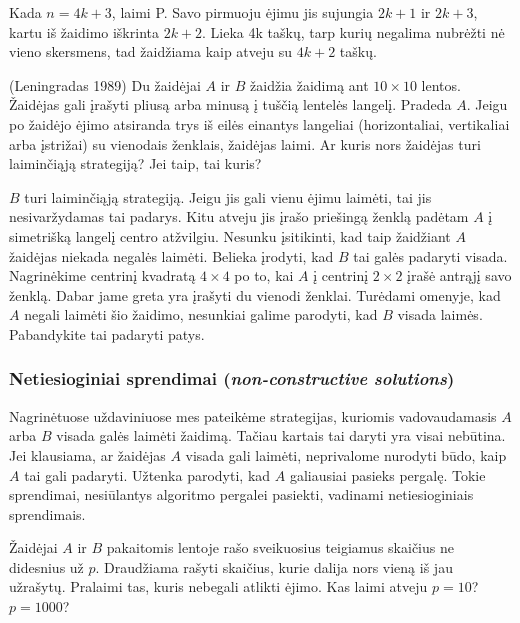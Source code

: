 Kada $n=4k+3$, laimi P. Savo pirmuoju ėjimu jis sujungia $2k+1$ ir $2k+3$,
kartu iš žaidimo iškrinta $2k+2$. Lieka 4k taškų, tarp kurių negalima
nubrėžti nė vieno skersmens, tad žaidžiama kaip atveju su $4k+2$ taškų. 

\begin{pavnr}{(Leningradas 1989)}
  Du žaidėjai $A$ ir $B$ žaidžia žaidimą ant $10\times 10$ lentos. Žaidėjas
  gali įrašyti pliusą arba minusą į tuščią lentelės langelį. Pradeda $A$.
  Jeigu po žaidėjo ėjimo atsiranda trys iš eilės einantys langeliai
  (horizontaliai, vertikaliai arba įstrižai) su vienodais ženklais,
  žaidėjas laimi. Ar kuris nors žaidėjas turi laiminčiąją strategiją? Jei
  taip, tai kuris?
\end{pavnr}

$B$ turi laiminčiąją strategiją. Jeigu jis gali vienu ėjimu laimėti, tai jis
nesivaržydamas  tai padarys. Kitu atveju jis įrašo priešingą ženklą padėtam
$A$ į simetrišką langelį centro atžvilgiu. Nesunku įsitikinti, kad taip
žaidžiant $A$ žaidėjas niekada negalės laimėti. Belieka
įrodyti, kad $B$ tai galės padaryti visada. Nagrinėkime centrinį kvadratą
$4\times 4$ po to, kai $A$ į centrinį $2\times 2$ įrašė antrąjį savo
ženklą. Dabar jame greta yra įrašyti du vienodi ženklai. Turėdami omenyje,
kad $A$ negali laimėti šio žaidimo, nesunkiai galime parodyti, kad $B$ visada
laimės. Pabandykite tai padaryti patys.  

\subsubsection{Netiesioginiai sprendimai (\emph{non-constructive solutions})}

Nagrinėtuose uždaviniuose mes pateikėme strategijas, kuriomis
vadovaudamasis $A$ arba $B$ visada galės laimėti žaidimą. Tačiau kartais tai
daryti yra visai nebūtina. Jei klausiama, ar žaidėjas $A$ visada gali
laimėti, neprivalome nurodyti būdo, kaip $A$ tai gali padaryti. Užtenka
parodyti, kad $A$ galiausiai pasieks pergalę. Tokie sprendimai, nesiūlantys
algoritmo pergalei pasiekti, vadinami netiesioginiais sprendimais. 

\begin{pavnr}
  Žaidėjai $A$ ir $B$ pakaitomis lentoje rašo sveikuosius teigiamus skaičius
  ne didesnius už $p$. Draudžiama rašyti skaičius, kurie dalija nors vieną iš
  jau užrašytų. Pralaimi tas, kuris nebegali atlikti ėjimo. Kas laimi atveju
  $p=10$? $p=1000$?
\end{pavnr}

